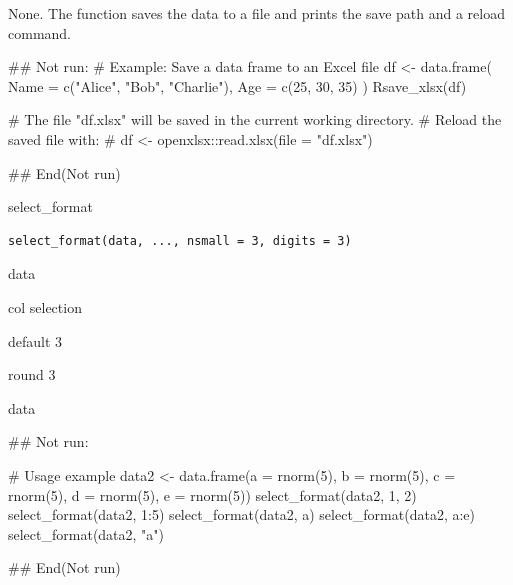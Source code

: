 \documentclass[a4paper]{book}
\begin{document}
%
\begin{Value}
None. The function saves the data to a file and prints the save path and a reload command.
\end{Value}
%
\begin{Examples}
\begin{ExampleCode}
## Not run: 
# Example: Save a data frame to an Excel file
df <- data.frame(
  Name = c("Alice", "Bob", "Charlie"),
  Age = c(25, 30, 35)
)
Rsave_xlsx(df)

# The file "df.xlsx" will be saved in the current working directory.
# Reload the saved file with:
# df <- openxlsx::read.xlsx(file = "df.xlsx")

## End(Not run)
\end{ExampleCode}
\end{Examples}
%
\begin{Description}
select\_format
\end{Description}
%
\begin{Usage}
\begin{verbatim}
select_format(data, ..., nsmall = 3, digits = 3)
\end{verbatim}
\end{Usage}
%
\begin{Arguments}
\begin{ldescription}
\item[\code{data}] data

\item[\code{...}] col selection

\item[\code{nsmall}] default 3

\item[\code{digits}] round 3
\end{ldescription}
\end{Arguments}
%
\begin{Value}
data
\end{Value}
%
\begin{Examples}
\begin{ExampleCode}


## Not run: 


# Usage example
data2 <- data.frame(a = rnorm(5), b = rnorm(5), c = rnorm(5), d = rnorm(5), e = rnorm(5))
select_format(data2, 1, 2)
select_format(data2, 1:5)
select_format(data2, a)
select_format(data2, a:e)
select_format(data2, "a")

## End(Not run)
\end{ExampleCode}
\end{Examples}
\end{document}
